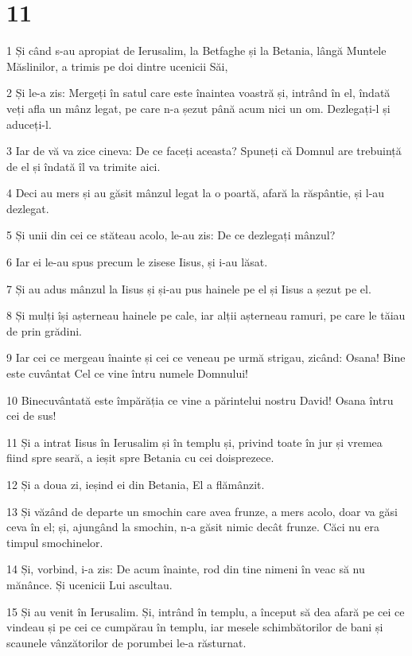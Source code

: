 \chapter{11}

\par 1 Și când s-au apropiat de Ierusalim, la Betfaghe și la Betania, lângă Muntele Măslinilor, a trimis pe doi dintre ucenicii Săi,
\par 2 Și le-a zis: Mergeți în satul care este înaintea voastră și, intrând în el, îndată veți afla un mânz legat, pe care n-a șezut până acum nici un om. Dezlegați-l și aduceți-l.
\par 3 Iar de vă va zice cineva: De ce faceți aceasta? Spuneți că Domnul are trebuință de el și îndată îl va trimite aici.
\par 4 Deci au mers și au găsit mânzul legat la o poartă, afară la răspântie, și l-au dezlegat.
\par 5 Și unii din cei ce stăteau acolo, le-au zis: De ce dezlegați mânzul?
\par 6 Iar ei le-au spus precum le zisese Iisus, și i-au lăsat.
\par 7 Și au adus mânzul la Iisus și și-au pus hainele pe el și Iisus a șezut pe el.
\par 8 Și mulți își așterneau hainele pe cale, iar alții așterneau ramuri, pe care le tăiau de prin grădini.
\par 9 Iar cei ce mergeau înainte și cei ce veneau pe urmă strigau, zicând: Osana! Bine este cuvântat Cel ce vine întru numele Domnului!
\par 10 Binecuvântată este împărăția ce vine a părintelui nostru David! Osana întru cei de sus!
\par 11 Și a intrat Iisus în Ierusalim și în templu și, privind toate în jur și vremea fiind spre seară, a ieșit spre Betania cu cei doisprezece.
\par 12 Și a doua zi, ieșind ei din Betania, El a flămânzit.
\par 13 Și văzând de departe un smochin care avea frunze, a mers acolo, doar va găsi ceva în el; și, ajungând la smochin, n-a găsit nimic decât frunze. Căci nu era timpul smochinelor.
\par 14 Și, vorbind, i-a zis: De acum înainte, rod din tine nimeni în veac să nu mănânce. Și ucenicii Lui ascultau.
\par 15 Și au venit în Ierusalim. Și, intrând în templu, a început să dea afară pe cei ce vindeau și pe cei ce cumpărau în templu, iar mesele schimbătorilor de bani și scaunele vânzătorilor de porumbei le-a răsturnat.
